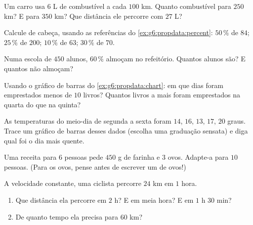 \begin{exercise}[$\star$]\label{exo:g6:propdata:4}
Um carro usa $6$ L de combustível a cada $100$ km. Quanto combustível
para $250$ km? E para $350$ km? Que distância ele percorre com $27$ L?
\end{exercise}

\begin{exercise}[$\star$]\label{exo:g6:propdata:5}
Calcule de cabeça, usando as referências do
\cref{ex:g6:propdata:percent}: $50\,\%$ de $84$; \quad $25\,\%$ de
$200$; \quad $10\,\%$ de $63$; \quad $30\,\%$ de $70$.
\end{exercise}

\begin{exercise}[$\star$]\label{exo:g6:propdata:6}
Numa escola de $450$ alunos, $60\,\%$ almoçam no refeitório. Quantos
alunos são? E quantos não almoçam?
\end{exercise}

\begin{exercise}[$\star$]\label{exo:g6:propdata:7}
Usando o gráfico de barras do \cref{ex:g6:propdata:chart}: em que dias
foram emprestados menos de $10$ livros? Quantos livros a mais foram
emprestados na quarta do que na quinta?
\end{exercise}

\begin{exercise}[$\star$]\label{exo:g6:propdata:8}
As temperaturas do meio-dia de segunda a sexta foram $14$, $16$, $13$,
$17$, $20$ graus. Trace um gráfico de barras desses dados (escolha uma
graduação sensata) e diga qual foi o dia mais quente.
\end{exercise}

\begin{exercise}[$\star\star$]\label{exo:g6:propdata:9}
Uma receita para $6$ pessoas pede $450$ g de farinha e $3$ ovos.
Adapte-a para $10$ pessoas. (Para os ovos, pense antes de escrever um
 de ovos!)
\end{exercise}

\begin{exercise}[$\star\star$]\label{exo:g6:propdata:10}
A velocidade constante, uma ciclista percorre $24$ km em $1$ hora.
\begin{enumerate}
  \item Que distância ela percorre em $2$ h? E em meia hora? E em
        $1$ h $30$ min?
  \item De quanto tempo ela precisa para $60$ km?
\end{enumerate}
\end{exercise}

